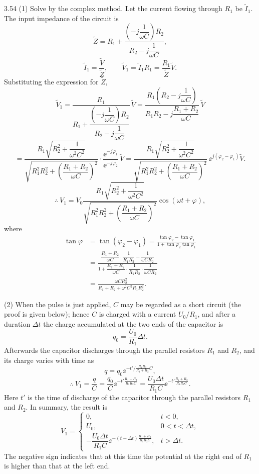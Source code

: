 \begin{solution}{3.54}
(1) Solve by the complex method. Let the current flowing through $R_1$ be $\tilde{I}_1$. The input impedance of the circuit is
\[
\tilde{Z}=R_1+\frac{\left(-j\dfrac{1}{\omega C}\right)R_2}{R_2-j\dfrac{1}{\omega C}},
\]
\[
\tilde{I}_1=\frac{\tilde{V}}{\tilde{Z}},\qquad
\tilde{V}_1=\tilde{I}_1R_1=\frac{R_1}{\tilde{Z}}\tilde{V}.
\]
Substituting the expression for $\tilde{Z}$,
\[
\tilde{V}_1=\frac{R_1}{R_1+\dfrac{\left(-j\dfrac{1}{\omega C}\right)R_2}{R_2-j\dfrac{1}{\omega C}}}\,\tilde{V}
=\frac{R_1\left(R_2-j\dfrac{1}{\omega C}\right)}{R_1R_2-j\dfrac{R_1+R_2}{\omega C}}\,\tilde{V}
\]
\[
=\frac{R_1\sqrt{R_2^2+\dfrac{1}{\omega^2C^2}}}
{\sqrt{R_1^2R_2^2+\left(\dfrac{R_1+R_2}{\omega C}\right)^2}}
\cdot\frac{\ee^{-j\varphi_1}}{\ee^{-j\varphi_2}}\,\tilde{V}
=\frac{R_1\sqrt{R_2^2+\dfrac{1}{\omega^2C^2}}}
{\sqrt{R_1^2R_2^2+\left(\dfrac{R_1+R_2}{\omega C}\right)^2}}
\,\ee^{j(\varphi_2-\varphi_1)}\tilde{V}.
\]
\[
\therefore\ V_1=V_0\frac{R_1\sqrt{R_2^2+\dfrac{1}{\omega^2C^2}}}
{\sqrt{R_1^2R_2^2+\left(\dfrac{R_1+R_2}{\omega C}\right)^2}}\cos(\omega t+\varphi),
\]
where
\begin{align*}
\tan\varphi&=\tan(\varphi_2-\varphi_1)=\frac{\tan\varphi_2-\tan\varphi_1}{1+\tan\varphi_2\tan\varphi_1}\\
&=\frac{\dfrac{R_1+R_2}{\omega C}\cdot\dfrac{1}{R_1R_2}-\dfrac{1}{\omega CR_2}}
{1+\dfrac{R_1+R_2}{\omega C}\cdot\dfrac{1}{R_1R_2}\cdot\dfrac{1}{\omega CR_2}}\\
&=\frac{\omega CR_2^2}{R_1+R_2+\omega^2C^2R_1R_2^2}.
\end{align*}

(2) When the pulse is just applied, $C$ may be regarded as a short circuit (the proof is given below); hence $C$ is charged with a current $U_0/R_1$, and after a duration $\Delta t$ the charge accumulated at the two ends of the capacitor is
\[
q_0=\frac{U_0}{R_1}\Delta t.
\]
Afterwards the capacitor discharges through the parallel resistors $R_1$ and $R_2$, and its charge varies with time as
\[
q=q_0\ee^{-t'/\frac{R_1R_2}{R_1+R_2}C},
\]
\[
\therefore\ V_1=\frac{q}{C}=\frac{q_0}{C}\ee^{-t'\frac{R_1+R_2}{R_1R_2C}}
=\frac{U_0\Delta t}{R_1C}\ee^{-t'\frac{R_1+R_2}{R_1R_2C}}.
\]
Here $t'$ is the time of discharge of the capacitor through the parallel resistors $R_1$ and $R_2$. In summary, the result is
\[
V_1=\begin{cases}
0, & t<0,\\[4pt]
U_0, & 0<t<\Delta t,\\[4pt]
-\dfrac{U_0\Delta t}{R_1C}\ee^{-(t-\Delta t)\frac{R_1+R_2}{R_1R_2C}}, & t>\Delta t.
\end{cases}
\]
The negative sign indicates that at this time the potential at the right end of $R_1$ is higher than that at the left end.


\end{solution}
